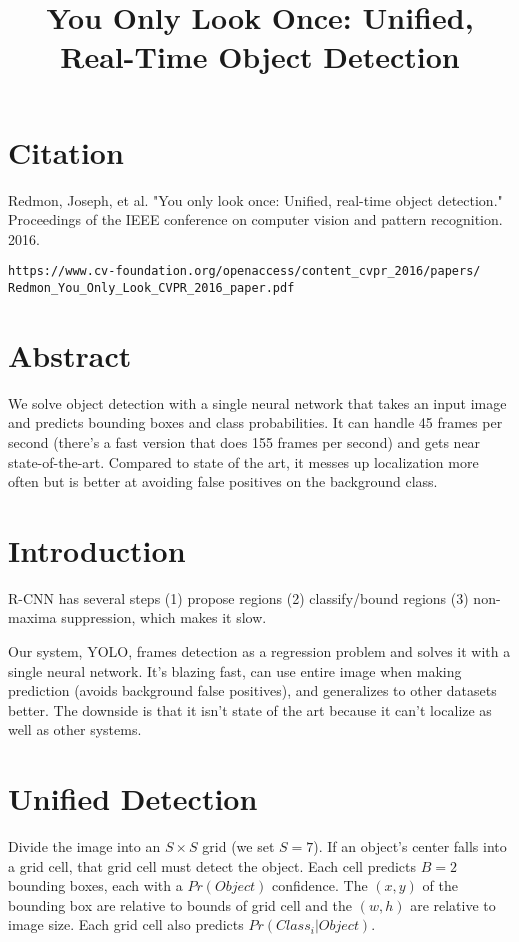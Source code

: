 \documentclass[a4paper]{article}
\title{You Only Look Once: Unified, Real-Time Object Detection}
\date{}
\begin{document}
\maketitle

\section{Citation}
Redmon, Joseph, et al. "You only look once: Unified, real-time object detection." Proceedings of the IEEE conference on computer vision and pattern recognition. 2016.

\begin{verbatim}
https://www.cv-foundation.org/openaccess/content_cvpr_2016/papers/
Redmon_You_Only_Look_CVPR_2016_paper.pdf
\end{verbatim}

\section{Abstract}
We solve object detection with a single neural network that takes an input
image and predicts bounding boxes and class probabilities. It can handle 45
frames per second (there's a fast version that does 155 frames per second) and
gets near state-of-the-art. Compared to state of the art, it messes up
localization more often but is better at avoiding false positives on the
background class.

\section{Introduction}
R-CNN has several steps (1) propose regions (2) classify/bound regions (3)
non-maxima suppression, which makes it slow.

Our system, YOLO, frames detection as a regression problem and solves it with
a single neural network. It's blazing fast, can use entire image when making
prediction (avoids background false positives), and generalizes to other
datasets better. The downside is that it isn't state of the art because it
can't localize as well as other systems.

\section{Unified Detection}
Divide the image into an $S \times S$ grid (we set $S = 7$). If an object's
center falls into a grid cell, that grid cell must detect the object. Each
cell predicts $B = 2$ bounding boxes, each with a $Pr(Object)$ confidence. The
$(x, y)$ of the bounding box are relative to bounds of grid cell and the $(w, h)
$ are relative to image size. Each grid cell also predicts $Pr(Class_i | Object)
$.
\end{document}
